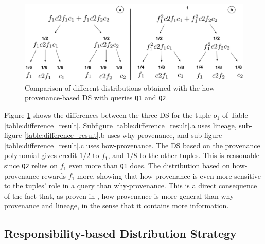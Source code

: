 \documentclass[preprint,12pt,sort&compress]{elsarticle}
\newcommand{\rtwo}[1]{\textcolor{reviewer2}{#1}}
\newcommand{\scream}[1]{{\bf * #1 *}{\typeout{#1}}}
\begin{document}

\begin{figure}[]
\centering
  \includegraphics[width=.8\textwidth]{figures/new_comparison}
  \caption{Comparison of different distributions obtained with the how-provenance-based DS with queries \texttt{Q1} and \texttt{Q2}.}
  \label{figure:distributions_differences}
\end{figure}


Figure \ref{figure:distributions_differences} shows the differences between the three DS for the tuple $o_1$ of Table \ref{table:difference_result}. Subfigure \ref{table:difference_result}.a uses lineage, sub-figure \ref{table:difference_result}.b uses why-provenance, and sub-figure \ref{table:difference_result}.c uses how-provenance. 
The DS based on the provenance polynomial gives credit $1/2$ to $f_1$, and $1/8$ to the other tuples.
This is reasonable since \texttt{Q2} relies on $f_1$ even more than \texttt{Q1} does. 
The distribution based on how-provenance rewards $f_1$ more, showing that how-provenance is even more sensitive to the tuples' role in a query than why-provenance. %
This is a direct consequence of the fact that, as proven in \citep{howProvenanceGreen}, how-provenance is more general than why-provenance and lineage, in the sense that it contains more information. 

\rtwo{\subsection{Responsibility-based Distribution Strategy}}
\end{document}
